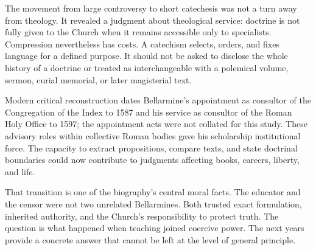 The movement from large controversy to short catechesis was not a turn away
from theology.  It revealed a judgment about theological service: doctrine is
not fully given to the Church when it remains accessible only to specialists.
Compression nevertheless has costs.  A catechism selects, orders, and fixes
language for a defined purpose.  It should not be asked to disclose the whole
history of a doctrine or treated as interchangeable with a polemical volume,
sermon, curial memorial, or later magisterial text.

Modern critical reconstruction dates Bellarmine's appointment as consultor of
the Congregation of the Index to 1587 and his service as consultor of the Roman
Holy Office to 1597; the appointment acts were not collated for this study.
These advisory roles within collective Roman bodies gave his scholarship
institutional force.  The capacity to extract propositions, compare texts, and
state doctrinal boundaries could now contribute to judgments affecting books,
careers, liberty, and life.

That transition is one of the biography's central moral facts.  The educator
and the censor were not two unrelated Bellarmines.  Both trusted exact
formulation, inherited authority, and the Church's responsibility to protect
truth.  The question is what happened when teaching joined coercive power.
The next years provide a concrete answer that cannot be left at the level of
general principle.
